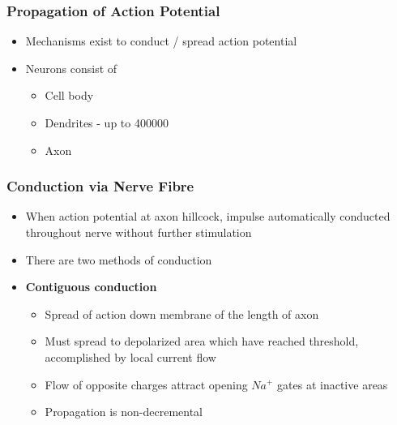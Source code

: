 \documentclass[11pt]{article}
\begin{document}
\subsubsection{Propagation of Action Potential}
\begin{itemize}
\item Mechanisms exist to conduct / spread action potential 
\item Neurons consist of 
\begin{itemize}
\item Cell body
\item Dendrites - up to 400000
\item Axon
\end{itemize}
\end{itemize}

\subsubsection{Conduction via Nerve Fibre}
\begin{itemize}
\item When action potential at axon hillcock, impulse automatically conducted throughout nerve without further stimulation
\item There are two methods of conduction
\item \textbf{Contiguous conduction}
\begin{itemize}
\item Spread of action down membrane of the length of axon
\item Must spread to depolarized area which have reached threshold, accomplished by local current flow 
\item Flow of opposite charges attract opening $Na^+$ gates at inactive areas
\item Propagation is non-decremental
\end{itemize}
\end{itemize}
\end{document}
